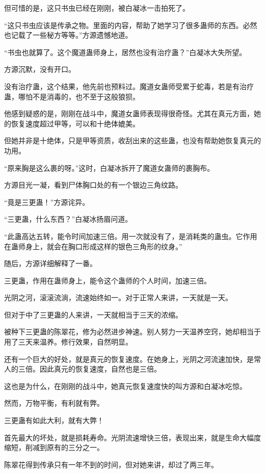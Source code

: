 \begin{this_body}
但可惜的是，这只书虫已经在刚刚，被白凝冰一击拍死了。

“这只书虫应该是传承之物。里面的内容，帮助了她学习了很多蛊师的东西。必然也记载了一些秘方等等。”方源遗憾地道。

“书虫也就算了。这个魔道蛊师身上，居然也没有治疗蛊？”白凝冰大失所望。

方源沉默，没有开口。

没有治疗蛊，这个结果，他先前也预料过。魔道女蛊师受累于蛇毒，若是有治疗蛊，哪怕不是消毒的，也不至于这般狼狈。

他感到疑惑的是，刚刚在战斗中，魔道女蛊师表现得很奇怪。尤其在真元方面，她的恢复速度超过甲等，可以和十绝体媲美。

但她并非是十绝体，只是甲等资质，收刮出来的这些蛊，也没有帮助她恢复真元的功用。

“原来胸是这么裹的呀。”这时，白凝冰拆开了魔道女蛊师的裹胸布。

方源目光一凝，看到尸体胸口处的有一个银边三角纹路。

“竟是三更蛊！”方源诧异。

“三更蛊，什么东西？”白凝冰扬眉问道。

“此蛊高达五转，能令时间加速三倍。用一次就没有了，是消耗类的蛊虫。它作用在蛊师身上，就会在胸口形成这样的银色三角形的纹身。”

随后，方源详细解释了一番。

三更蛊，作用在蛊师身上，能令这个蛊师的个人时间，加速三倍。

光阴之河，滚滚流淌，流速始终如一。对于正常人来讲，一天就是一天。

但对于中了三更蛊的人来讲，一天就相当于三天的浓缩。

被种下三更蛊的陈翠花，修为必然进步神速。别人努力一天温养空窍，她却相当于用了三天来温养。修行效果，自然明显。

还有一个巨大的好处，就是真元的恢复速度。在她身上，光阴之河流速加快，是常人的三倍。因此真元的恢复速度，自然也是三倍。

这也是为什么，在刚刚的战斗中，她真元恢复速度快的叫方源和白凝冰吃惊。

然而，万物平衡，有利就有弊。

三更蛊有如此大利，就有大弊！

首先最大的坏处，就是损耗寿命。光阴流速增快三倍，表现出来，就是生命大幅度缩短，削减到原有的三分之一。

陈翠花得到传承只有一年不到的时间，但对她来讲，却过了两三年。


\end{this_body}
